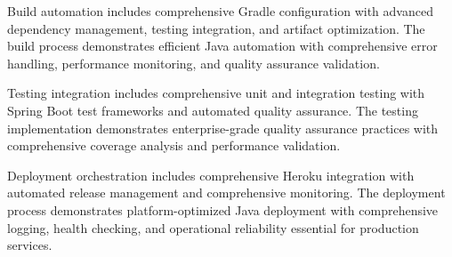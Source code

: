 Build automation includes comprehensive Gradle configuration with advanced dependency management, testing integration, and artifact optimization. The build process demonstrates efficient Java automation with comprehensive error handling, performance monitoring, and quality assurance validation.

Testing integration includes comprehensive unit and integration testing with Spring Boot test frameworks and automated quality assurance. The testing implementation demonstrates enterprise-grade quality assurance practices with comprehensive coverage analysis and performance validation.

Deployment orchestration includes comprehensive Heroku integration with automated release management and comprehensive monitoring. The deployment process demonstrates platform-optimized Java deployment with comprehensive logging, health checking, and operational reliability essential for production services.